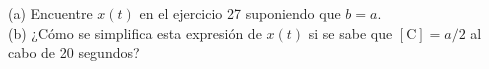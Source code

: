 \item (a) Encuentre $x(t)$ en el ejercicio 27 suponiendo que $b = a$. \\
    (b) ¿Cómo se simplifica esta expresión de $x(t)$ si se sabe que $[\mathrm{C}] = a/2$ al cabo de 20 segundos?
